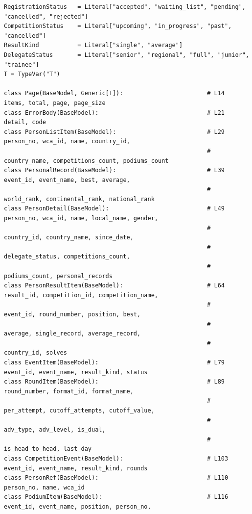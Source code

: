 \documentclass[11pt,a4paper]{article}
\begin{document}
\begin{lstlisting}
RegistrationStatus   = Literal["accepted", "waiting_list", "pending", "cancelled", "rejected"]
CompetitionStatus    = Literal["upcoming", "in_progress", "past", "cancelled"]
ResultKind           = Literal["single", "average"]
DelegateStatus       = Literal["senior", "regional", "full", "junior", "trainee"]
T = TypeVar("T")

class Page(BaseModel, Generic[T]):                        # L14   items, total, page, page_size
class ErrorBody(BaseModel):                               # L21   detail, code
class PersonListItem(BaseModel):                          # L29   person_no, wca_id, name, country_id,
                                                          #       country_name, competitions_count, podiums_count
class PersonalRecord(BaseModel):                          # L39   event_id, event_name, best, average,
                                                          #       world_rank, continental_rank, national_rank
class PersonDetail(BaseModel):                            # L49   person_no, wca_id, name, local_name, gender,
                                                          #       country_id, country_name, since_date,
                                                          #       delegate_status, competitions_count,
                                                          #       podiums_count, personal_records
class PersonResultItem(BaseModel):                        # L64   result_id, competition_id, competition_name,
                                                          #       event_id, round_number, position, best,
                                                          #       average, single_record, average_record,
                                                          #       country_id, solves
class EventItem(BaseModel):                               # L79   event_id, event_name, result_kind, status
class RoundItem(BaseModel):                               # L89   round_number, format_id, format_name,
                                                          #       per_attempt, cutoff_attempts, cutoff_value,
                                                          #       adv_type, adv_level, is_dual,
                                                          #       is_head_to_head, last_day
class CompetitionEvent(BaseModel):                        # L103  event_id, event_name, result_kind, rounds
class PersonRef(BaseModel):                               # L110  person_no, name, wca_id
class PodiumItem(BaseModel):                              # L116  event_id, event_name, position, person_no,

\end{lstlisting}
\end{document}
